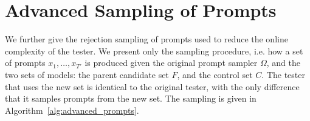 \section{Advanced Sampling of Prompts}
\label{sec:appendix:advanced_sampling}
We further give the rejection sampling of prompts used to reduce the online complexity of the tester. 
We present only the sampling procedure, i.e. how a set of prompts $x_1,\ldots,x_{T'}$ is produced given the original prompt sampler $\Omega$, and the two sets of models: the parent candidate set $F$, and the control set $C$. The tester that uses the new set is identical to the original tester, with the only difference that it samples prompts from the new set. 
The sampling is given in Algorithm~\ref{alg:advanced_prompts}.
